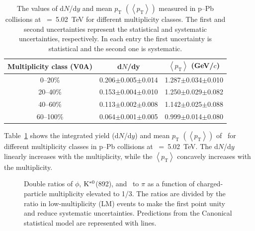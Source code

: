 \begin{table}[h!]
\caption{The values of d$N$/d$y$ and mean $p_{\mathrm{T}}$ $\left( \left\langle p_{\mathrm{T}} \right\rangle \right)$ measured in p--Pb collisions at \snn~=~5.02~TeV for different multiplicity classes. The first and second uncertainties represent the statistical and systematic uncertainties, respectively. In each entry the first uncertainty is statistical and the second one is systematic. }
\centering
\begin{tabular}{ccc}
\hline 
Multiplicity class (V0A) & d$N$/dy & $\left\langle p_{\mathrm{T}} \right\rangle$ (GeV/$c$) \\ \hline
0--20\% & 0.206$\pm$0.005$\pm$0.014 & 1.287$\pm$0.034$\pm$0.010 \\
20--40\% & 0.153$\pm$0.004$\pm$0.010 & 1.250$\pm$0.029$\pm$0.082 \\
40--60\% & 0.113$\pm$0.002$\pm$0.008 & 1.142$\pm$0.025$\pm$0.088 \\
60--100\% & 0.064$\pm$0.001$\pm$0.005 & 0.999$\pm$0.014$\pm$0.080 \\
\hline
\end{tabular}
\label{tab:ymp}
\end{table}

Table~\ref{tab:ymp} shows the integrated yield (d$N$/d$y$) and mean $p_{\mathrm{T}}$ $\left( \left\langle p_{\mathrm{T}} \right\rangle \right)$ of \fzero~for different multiplicity classes in p--Pb collisions at \snn~=~5.02~TeV. The d$N$/d$y$ linearly increases with the multiplicity, while the $\left\langle p_{\mathrm{T}} \right\rangle$ concavely increases with the multiplicity. 

\begin{figure}[!hbt]
	\centering
	\caption{ Double ratios of $\phi$, $\rm{}K^{*0}$(892), and \fzero~to $\pi$ as a function of charged-particle multiplicity elevated to 1/3. The ratios are divided by the ratio in low-multiplicity (LM) events to make the first point unity and reduce systematic uncertainties. Predictions from the Canonical statistical model are represented with lines. }
	\label{fig:f0piAddCSM}
\end{figure}

